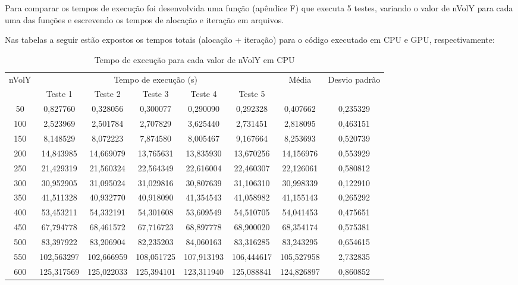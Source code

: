 \documentclass[12pt,a4paper]{article}
\begin{document}
Para comparar os tempos de execução foi desenvolvida uma função (apêndice F) que executa 5 testes, variando o valor de nVolY para cada uma das funções e escrevendo os tempos de alocação e iteração em arquivos.

Nas tabelas a seguir estão expostos os tempos totais (alocação + iteração) para o código executado em CPU e GPU, respectivamente:

\begin{table}[!h]
    \caption{Tempo de execução para cada valor de nVolY em CPU}
    \label{tab:cpu-times-table}
    \vspace{0.5cm}
    \hspace{-2cm}\begin{tabular}{c|c|c|c|c|c|c|c}
        \multirow{2}{*}{nVolY} & \multicolumn{5}{c}{Tempo de execução (s)} & \multirow{2}{*}{Média} & \multirow{2}{*}{Desvio padrão} \\
            & Teste 1    & Teste 2    & Teste 3    & Teste 4    & Teste 5    &            &          \\
        50  & 0,827760   & 0,328056   & 0,300077   & 0,290090   & 0,292328   & 0,407662   & 0,235329 \\
        100 & 2,523969   & 2,501784   & 2,707829   & 3,625440   & 2,731451   & 2,818095   & 0,463151 \\
        150 & 8,148529   & 8,072223   & 7,874580   & 8,005467   & 9,167664   & 8,253693   & 0,520739 \\
        200 & 14,843985  & 14,669079  & 13,765631  & 13,835930  & 13,670256  & 14,156976  & 0,553929 \\
        250 & 21,429319  & 21,560324  & 22,564349  & 22,616004  & 22,460307  & 22,126061  & 0,580812 \\
        300 & 30,952905  & 31,095024  & 31,029816  & 30,807639  & 31,106310  & 30,998339  & 0,122910 \\
        350 & 41,511328  & 40,932770  & 40,918090  & 41,354543  & 41,058982  & 41,155143  & 0,265292 \\
        400 & 53,453211  & 54,332191  & 54,301608  & 53,609549  & 54,510705  & 54,041453  & 0,475651 \\
        450 & 67,794778  & 68,461572  & 67,716723  & 68,897778  & 68,900020  & 68,354174  & 0,575381 \\
        500 & 83,397922  & 83,206904  & 82,235203  & 84,060163  & 83,316285  & 83,243295  & 0,654615 \\
        550 & 102,563297 & 102,666959 & 108,051725 & 107,913193 & 106,444617 & 105,527958 & 2,732835 \\
        600 & 125,317569 & 125,022033 & 125,394101 & 123,311940 & 125,088841 & 124,826897 & 0,860852
    \end{tabular}
\end{table}
\end{document}
